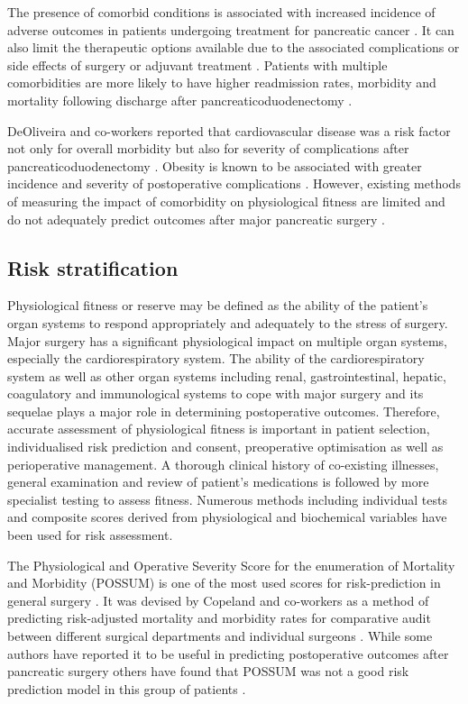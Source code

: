 The presence of comorbid conditions is associated with increased incidence of adverse outcomes in patients undergoing treatment for pancreatic cancer \parencite{mann_review_2010}. 
It can also limit the therapeutic options available due to the associated complications or side effects of surgery or adjuvant treatment \parencite{sandroussi_sociodemographics_2010}. 
Patients with multiple comorbidities are more likely to have higher readmission rates, morbidity and mortality following discharge after pancreaticoduodenectomy \parencite{teh_patient_2009}. 

DeOliveira and co-workers reported that cardiovascular disease was a risk factor not only for overall morbidity but also for severity of complications after pancreaticoduodenectomy \parencite{deoliveira_assessment_2006}. 
Obesity is known to be associated with greater incidence and severity of postoperative complications \parencite{benns_impact_2009}. 
However, existing methods of measuring the impact of comorbidity on physiological fitness are limited and do not adequately predict outcomes after major pancreatic surgery \parencite{de_castro_evaluation_2009}. 

\subsection{Risk stratification}
Physiological fitness or reserve may be defined as the ability of the patient's organ systems to respond appropriately and adequately to the stress of surgery. 
Major surgery has a significant physiological impact on multiple organ systems, especially the cardiorespiratory system. 
The ability of the cardiorespiratory system as well as other organ systems including renal, gastrointestinal, hepatic, coagulatory and immunological systems to cope with major surgery and its sequelae plays a major role in determining postoperative outcomes. 
Therefore, accurate assessment of physiological fitness is important in patient selection, individualised risk prediction and consent, preoperative optimisation as well as perioperative management. 
A thorough clinical history of co-existing illnesses, general examination and review of patient's medications is followed by more specialist testing to assess fitness. 
Numerous methods including individual tests and composite scores derived from physiological and biochemical variables have been used for risk assessment.

The Physiological and Operative Severity Score for the enumeration of Mortality and Morbidity (POSSUM) is one of the most used scores for risk-prediction in general surgery \parencite{copeland_possum:_1991}.
It was devised by Copeland and co-workers as a method of predicting risk-adjusted mortality and morbidity rates for comparative audit between different surgical departments \parencite{copeland_comparative_1993} and individual surgeons \parencite{copeland_risk-adjusted_1995}.
While some authors have reported it to be useful in predicting postoperative outcomes after pancreatic surgery \parencite{pratt_possum_2008} others have found that POSSUM was not a good risk prediction model in this group of patients \parencite{khan_evaluation_2003, kocher_risk-adjustment_2005, tamijmarane_application_2008, de_castro_evaluation_2009}.


